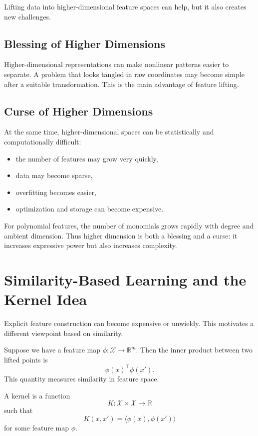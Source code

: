Lifting data into higher-dimensional feature spaces can help, but it also creates new challenges.

\subsection{Blessing of Higher Dimensions}

Higher-dimensional representations can make nonlinear patterns easier to separate. A problem that looks tangled in raw coordinates may become simple after a suitable transformation. This is the main advantage of feature lifting.

\subsection{Curse of Higher Dimensions}

At the same time, higher-dimensional spaces can be statistically and computationally difficult:
\begin{itemize}
    \item the number of features may grow very quickly,
    \item data may become sparse,
    \item overfitting becomes easier,
    \item optimization and storage can become expensive.
\end{itemize}

For polynomial features, the number of monomials grows rapidly with degree and ambient dimension. Thus higher dimension is both a blessing and a curse: it increases expressive power but also increases complexity.

\section{Similarity-Based Learning and the Kernel Idea}

Explicit feature construction can become expensive or unwieldy. This motivates a different viewpoint based on similarity.

Suppose we have a feature map $\phi:\mathcal X\to\mathbb R^m$. Then the inner product between two lifted points is
\[
\phi(x)^\top \phi(x').
\]
This quantity measures similarity in feature space.

\begin{definition}[Kernel]
A kernel is a function
\[
K:\mathcal X\times\mathcal X\to\mathbb R
\]
such that
\[
K(x,x')=\langle \phi(x),\phi(x')\rangle
\]
for some feature map $\phi$.
\end{definition}

